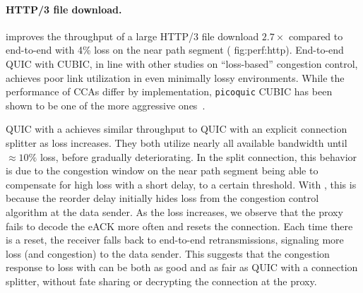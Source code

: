 \paragraph{HTTP/3 file download.}
\Sys improves the throughput of a large HTTP/3 file download
$2.7\times$
compared to end-to-end with 4\% loss on the near path segment (\Cref
{fig:perf:http}). End-to-end QUIC with CUBIC, in line with other studies on
``loss-based'' congestion control, achieves poor link utilization in even
minimally lossy environments. While the performance of CCAs differ by
implementation, \texttt{picoquic} CUBIC has been shown to be one of the more
aggressive ones~\cite{atc-submission}.

QUIC with a \Sys achieves similar throughput to QUIC with an explicit connection
splitter as loss increases. They both utilize nearly all available bandwidth
until $\approx\!10\%$ loss, before gradually deteriorating. In the split
connection, this behavior is due to the congestion window on the near path segment being
able to compensate for high loss with a short delay, to a certain threshold.
With \Sys, this is because the reorder delay initially hides loss from the congestion
control algorithm at the data sender. As the loss increases, we observe that the
proxy fails to decode the eACK more often and resets the connection. Each time
there is a reset, the receiver falls back to end-to-end retransmissions,
signaling more loss (and congestion) to the data sender.
This suggests that
the congestion response to loss with \Sys can be both as good and as fair as QUIC with a connection
splitter, without fate sharing or decrypting the connection at the proxy.



